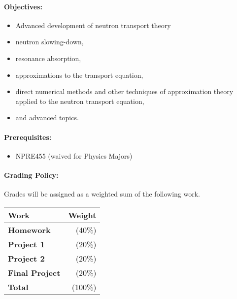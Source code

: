 \documentclass[11pt, a4paper]{article}
\begin{document}

\renewcommand{\refname}{\normalfont\selectfont\normalsize}\vspace{-1cm}


\paragraph{Objectives:}
\begin{itemize}
\item Advanced development of neutron transport theory
\item  neutron slowing-down,
\item resonance absorption,
\item  approximations to the transport equation,
\item  direct numerical methods and other techniques of approximation theory 
        applied to the neutron transport equation,
\item  and advanced topics. 
\end{itemize}

\paragraph{Prerequisites:}
\begin{itemize}
\item NPRE455 (waived for Physics Majors) 
\end{itemize}

\paragraph{Grading Policy:} Grades will be assigned as a weighted sum of the
following work.

\begin{table}[h]
\begin{tabularx}{\textwidth}{Xr}
        \textbf{Work} & \textbf{Weight} \\
\hline
\textbf{Homework}    & (40\%)  \\
\textbf{Project 1}    & (20\%)  \\
\textbf{Project 2}    & (20\%)  \\
\textbf{Final Project}  & (20\%)  \\
\hline
\textbf{Total}       & (100\%)\\
\end{tabularx}
\end{table}
\end{document}
